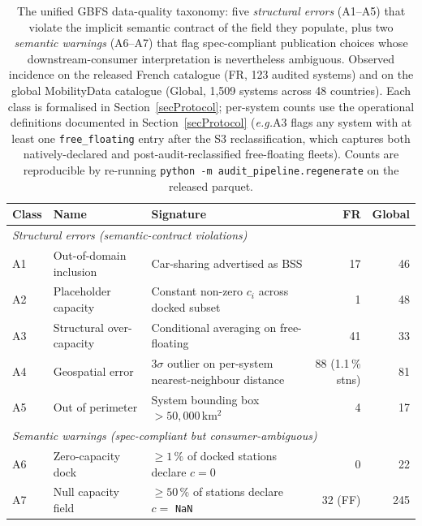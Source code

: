 \documentclass[11pt,a4paper]{article}
\newcommand{\eg}{\emph{e.g.}}
\begin{document}
\begin{table}[!htbp]
\centering
\caption{The unified GBFS data-quality taxonomy: five
\emph{structural errors} (A1--A5) that violate the implicit
semantic contract of the field they populate, plus two
\emph{semantic warnings} (A6--A7) that flag spec-compliant
publication choices whose downstream-consumer interpretation is
nevertheless ambiguous. Observed incidence on the released French
catalogue (FR, 123 audited systems) and on the global MobilityData
catalogue (Global, 1{,}509 systems across 48 countries). Each
class is formalised in Section~\ref{secProtocol};
per-system counts use the operational definitions documented in
Section~\ref{secProtocol} (\eg A3 flags any system with at least
one \texttt{free\_floating} entry after the S3 reclassification,
which captures both natively-declared and post-audit-reclassified
free-floating fleets). Counts are reproducible by re-running
\texttt{python -m audit\_pipeline.regenerate} on the released
parquet.}
\label{tab:anomalies}
\small
\begin{tabular}{@{}lllrr@{}}
\toprule
\textbf{Class} & \textbf{Name} & \textbf{Signature} & \textbf{FR} & \textbf{Global}\\
\midrule
\multicolumn{5}{l}{\textit{Structural errors (semantic-contract violations)}}\\
A1 & Out-of-domain inclusion       & Car-sharing advertised as BSS                          & 17         & 46        \\
A2 & Placeholder capacity          & Constant non-zero $c_i$ across docked subset           &  1         & 48        \\
A3 & Structural over-capacity      & Conditional averaging on free-floating                 & 41         & 33        \\
A4 & Geospatial error              & $3\sigma$ outlier on per-system nearest-neighbour distance & 88 (1.1\,\% stns) & 81 \\
A5 & Out of perimeter              & System bounding box $>50{,}000$\,km$^2$                &  4         & 17        \\
\midrule
\multicolumn{5}{l}{\textit{Semantic warnings (spec-compliant but consumer-ambiguous)}}\\
A6 & Zero-capacity dock            & $\geq 1\,\%$ of docked stations declare $c = 0$        &  0         & 22        \\
A7 & Null capacity field           & $\geq 50\,\%$ of stations declare $c = $ \texttt{NaN}  & 32 (FF)    & 245       \\
\bottomrule
\end{tabular}
\end{table}
\end{document}
